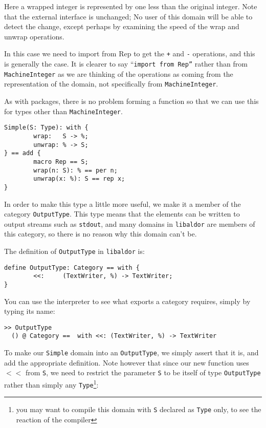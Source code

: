 \documentclass{article}
\newcommand{\libaldor}{{\tt libaldor}}
\begin{document}
Here a wrapped integer is represented by one less than the original
integer.  Note that the external interface is unchanged; No user of
this domain will be able to detect the change, except perhaps by
examining the speed of the wrap and unwrap operations.

In this case we need to import from Rep to get the {\tt +} and {\tt -}
operations, and this is generally the case.  It is clearer to say
``{\tt import from Rep''} rather than from {\tt MachineInteger} as we are
thinking of the operations as coming from the representation of the
domain, not specifically from {\tt MachineInteger}.

As with packages, there is no problem forming a function so that we
can use this for types other than {\tt MachineInteger}.

\begin{small}
\begin{verbatim}
Simple(S: Type): with {
        wrap:   S -> %;
        unwrap: % -> S;
} == add {
        macro Rep == S;
        wrap(n: S): % == per n;
        unwrap(x: %): S == rep x;
}
\end{verbatim}
\end{small}

In order to make this type a little more useful, we make it a member
of the category {\tt OutputType}. This type means that the elements
can be written to output streams such as {\tt stdout}, and many domains
in \libaldor{} are members of this category, so there is no reason why
this domain can't be.

The definition of {\tt OutputType} in \libaldor{} is:

\begin{small}
\begin{verbatim}
define OutputType: Category == with {
        <<:     (TextWriter, %) -> TextWriter;
}
\end{verbatim}
\end{small}

You can use the interpreter to see what exports a category requires,
simply by typing its name:
\begin{small}
\begin{verbatim}
>> OutputType
  () @ Category ==  with <<: (TextWriter, %) -> TextWriter
\end{verbatim}
\end{small}

To make our {\tt Simple} domain into an {\tt OutputType}, we simply
assert that it is, and add the appropriate definition. Note however that
since our new function uses {\tt $<<$} from {\tt S}, we need to restrict
the parameter {\tt S} to be itself of type {\tt OutputType} rather than
simply any {\tt Type}\footnote{you may want to compile this domain with
{\tt S} declared as {\tt Type} only, to see the reaction of the compiler}:
\end{document}
